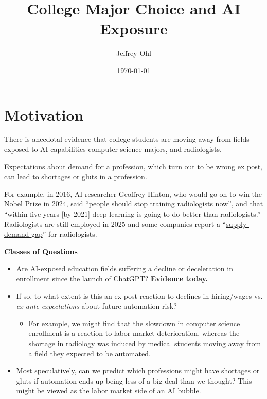\documentclass[12pt]{article}
\title{College Major Choice and AI Exposure}
\author{Jeffrey Ohl}
\begin{document}
\date{\today}
\section{Motivation}

There is anecdotal  evidence that college students are moving away from fields exposed to AI capabilities \href{https://www.theatlantic.com/economy/archive/2025/06/computer-science-bubble-ai/683242/}{computer science majors},  and \href{https://pmc.ncbi.nlm.nih.gov/articles/PMC10131993/}{radiologists}.


Expectations about demand for a profession, which turn out to be wrong ex post, can lead to shortages or gluts in a profession. 

For example, in 2016, AI researcher Geoffrey Hinton, who would go on to win the Nobel Prize in 2024, said ``\href{https://www.uab.edu/reporter/people-of-uab/this-radiologist-is-helping-doctors-see-through-the-hype-to-an-ai-future}{people should stop training radiologists now}'', and that ``within five years [by 2021] deep learning is going to do better than radiologists.''  Radiologists are still employed in 2025 and some companies report a ``\href{https://medicushcs.com/resources/the-radiologist-shortage-addressing-the-gap-between-supply-and-demand}{supply-demand gap}'' for radiologists.

\textbf{Classes of Questions}
\begin{itemize}
\item Are AI-exposed education fields suffering a decline or deceleration in enrollment since the launch of ChatGPT? \textbf{Evidence today.}
\item If so, to what extent is this an ex post reaction to declines in hiring/wages vs. \textit{ex ante expectations} about future automation risk?
\begin{itemize}
\item For example, we might find that the slowdown in computer science enrollment is a reaction to labor market deterioration, whereas the shortage in radiology was induced by medical students moving away from a field they expected to be automated. 
\end{itemize}
\item Most speculatively, can we predict which professions might have shortages or gluts if automation ends up being less of a big deal than we thought?  This might be viewed as the labor market side of an AI bubble. 
\end{itemize}
\end{document}
